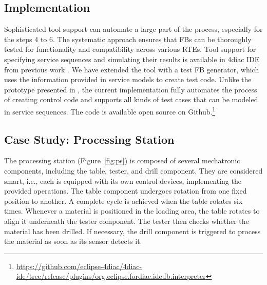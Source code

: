 \begin{bibunit}
\section{Implementation}
\label{sec::implementation}
Sophisticated tool support can automate a large part of the process, especially for the steps 4 to 6. The systematic approach ensures that FBs can be thoroughly tested for functionality and compatibility across various RTEs.
Tool support for specifying service sequences and simulating their results is available in 4diac IDE from previous work \cite{wiesmayr2021}. We have extended the tool with a test FB generator, which uses the information provided in service models to create test code. Unlike the prototype presented in \cite{biancaMidhunETFAwip}, the current implementation fully automates the process of creating control code and supports all kinds of test cases that can be modeled in service sequences. The code is available open source on Github.\footnote{\url{https://github.com/eclipse-4diac/4diac-ide/tree/release/plugins/org.eclipse.fordiac.ide.fb.interpreter}}

\subsection{Case Study: Processing Station}
\label{sec::casestudy}
\label{sec:drilling}
 
The processing station (Figure~\ref{fig:ps}) is composed of several mechatronic components, including the table, tester,  and drill component. They are considered smart, i.e., each is equipped with its own control devices, implementing the provided operations. The table component undergoes rotation from one fixed position to another. A complete cycle is achieved when the table rotates six times. Whenever a material is positioned in the loading area, the table rotates to align it underneath the tester component. The tester then checks whether the material has been drilled. If necessary, the drill component is triggered to process the material as soon as its sensor detects it. 


\end{bibunit}
